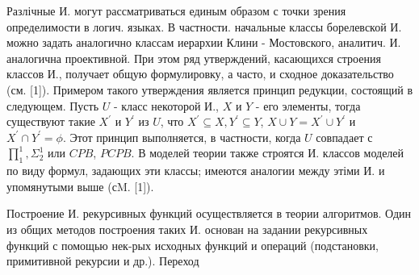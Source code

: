 \documentclass[10pt]{article}
\begin{document}
Разлічные И. могут рассматриваться единым образом с точки зрения определимости в логич. языках. В частности. начальные классы борелевской И. можно задать аналогично классам иерархии Клини - Мостовского, аналитич. И. аналогична проективной. При этом ряд утверждений, касающихся строения классов И., получает общую формулировку, а часто, и сходное доказательство (см. [1]). Примером такого утверждения является принцип редукции, состоящий в следующем. Пусть $U$ - класс некоторой И., $X$ и $Y$ - его элементы, тогда существуют такие $X^{\prime}$ и $Y^{\prime}$ из $U$, что $X^{\prime} \subseteq X, Y^{\prime} \subseteq Y$, $X \cup Y=X^{\prime} \cup Y^{\prime}$ и $X^{\prime} \cap Y^{\prime}=\phi$. Этот принцип выполняется, в частности, когда $U$ совпадает с $\prod_{1}^{1}, \Sigma_{2}^{1}$ или $C P B$, $P C P B$. В моделей теории также строятся И. классов моделей по виду формул, задающих эти классы; имеются аналогии между этіми И. и упомянутыми выше (сM. [1]).



Построение И. рекурсивных функций осуществляется в теории алгоритмов. Один из общих методов построения таких И. основан на задании рекурсивных функций с помощью нек-рых исходных функций и операций (подстановки, примитивной рекурсии и др.). Переход
\end{document}
